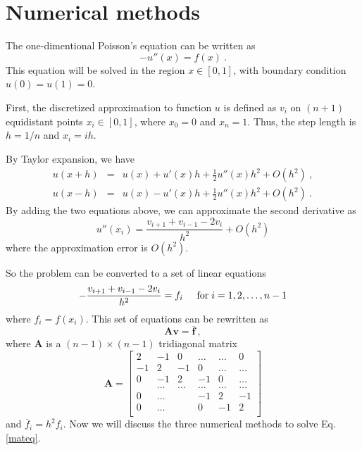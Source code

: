 \documentclass{article}
\begin{document}
	\section{Numerical methods}\label{method}
	The one-dimentional Poisson's equation can be written as
	\begin{equation}\label{diff}
	-u''(x) = f(x)\ .
	\end{equation}
	This equation will be solved in the region $x \in [0,1]$, 
	with boundary condition $u(0)=u(1)=0$. 
	\par
	First, the discretized approximation to function $u$ is defined as $v_i$ 
	on $(n+1)$ equidistant points $x_i \in [0,1]$, 
	where $x_0=0$ and $x_n=1$. Thus, the step length is $h=1/n$ and $x_i=ih$. 
	\par
	By Taylor expansion, we have
	\begin{eqnarray}
	u(x+h)&=&u(x)+u'(x)h+\frac{1}{2}u''(x)h^2+O(h^2)\ ,
	\\
	u(x-h)&=&u(x)-u'(x)h+\frac{1}{2}u''(x)h^2+O(h^2)\ .
	\end{eqnarray}
	By adding the two equations above, we can approximate the second derivative as
	\begin{equation}\label{diffappr}
	u''(x_i)=\frac{v_{i+1}+v_{i-1}-2v_i}{h^2}+O(h^2)
	\end{equation}
	where the approximation error is $O(h^2)$. 
	\par
	So the problem can be converted to a set of linear equations
	\begin{equation}
	-\frac{v_{i+1}+v_{i-1}-2v_i}{h^2} = f_i  \hspace{0.5cm} \mathrm{for} \hspace{0.1cm} i=1,2, \dots, n-1
	\end{equation}
	where $f_i=f(x_i)$. 
	This set of equations can be rewritten as 
	\begin{equation}\label{mateq}
	\mathbf{A}\mathbf{v} = \overline{\mathbf{f}}\ ,
	\end{equation}
	where $\mathbf{A}$ is a $(n-1) \times (n-1)$  tridiagonal matrix 
	\begin{equation}\label{matA}
	\mathbf{A} = \begin{bmatrix}
	2& -1& 0 &\dots   & \dots &0 \\
	-1 & 2 & -1 &0 &\dots &\dots \\
	0&-1 &2 & -1 & 0 & \dots \\
	& \dots   & \dots &\dots   &\dots & \dots \\
	0&\dots   &  &-1 &2& -1 \\
	0&\dots    &  & 0  &-1 & 2 \\
	\end{bmatrix}
	\end{equation}
	and $\overline{f}_i=h^2f_i$.
	Now we will discuss the three numerical methods to solve Eq. \ref{mateq}. 
\end{document}
